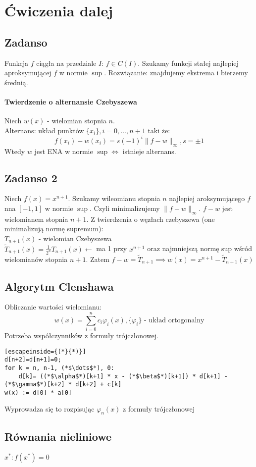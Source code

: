 \documentclass{article}
\begin{document}
\section{Ćwiczenia dalej}
\subsection{Zadanso}
Funkcja $ f $ ciągła na przedziale $ I $: $ f\in C(I) $. Szukamy funkcji stałej najlepiej aproksymującej $ f $ w normie $ \sup $.
Rozwiązanie: znajdujemy ekstrema i bierzemy średnią.
\paragraph{Twierdzenie o alternansie Czebyszewa}
Niech $ w(x) $ - wielomian stopnia $ n $.\\
Alternans: układ punktów $ \{x_i\}, i=0,\dots, n+1$ taki że: $$ f(x_i) - w(x_i)=s(-1)^i\|f-w\|_\infty, s=\pm 1 $$
Wtedy $ w $ jest ENA w normie $ \sup \iff$ istnieje alternans.
\subsection{Zadanso 2}
Niech $ f(x)=x^{n+1} $. Szukamy wileomianu stopnia $ n $ najlepiej aroksymującego $ f $ nna $ [-1,1] $ w normie $\sup$.
Czyli minimalizujemy $ \|f-w\|_\infty $.
$ f-w  $ jest wielomianem stopnia $ n+1 $. Z twierdzenia o węzłach czebyszewa (one minimalizują normę supremum):\\
$ T_{n+1}(x) $ - wielomian Czebyszewa\\
$ \tilde{T}_{n+1}(x)=\frac{1}{2^n}T_{n+1}(x) \leftarrow$  ma 1 przy $ x^{n+1} $ oraz najmniejszą normę sup wśród wielomianów stopnia $ n + 1 $.
Zatem $ f-w=\tilde{T}_{n+1}\implies w(x)=x^{n+1}-\tilde{T}_{n+1}(x) $
\subsection{Algorytm Clenshawa}
Obliczanie wartości wielomianu: 
$$ w(x)=\sum_{i=0}^{n}c_i\varphi_i(x), \{\varphi_i\}\text{  - układ ortogonalny} $$
Potrzeba współczynników z formuły trójczłonowej.
\begin{lstlisting}[escapeinside={(*}{*)}]
d[n+2]=d[n+1]=0;
for k = n, n-1, (*$\dots$*), 0:
	d[k]= ((*$\alpha$*)[k+1] * x - (*$\beta$*)[k+1]) * d[k+1] - (*$\gamma$*)[k+2] * d[k+2] + c[k]
w(x) := d[0] * a[0]
\end{lstlisting}
Wyprowadza się to rozpisując $ \varphi_n(x) $ z formuły trójczłonowej
\subsection{Równania nieliniowe}
$ x^*:f(x^*)=0 $
\end{document}
